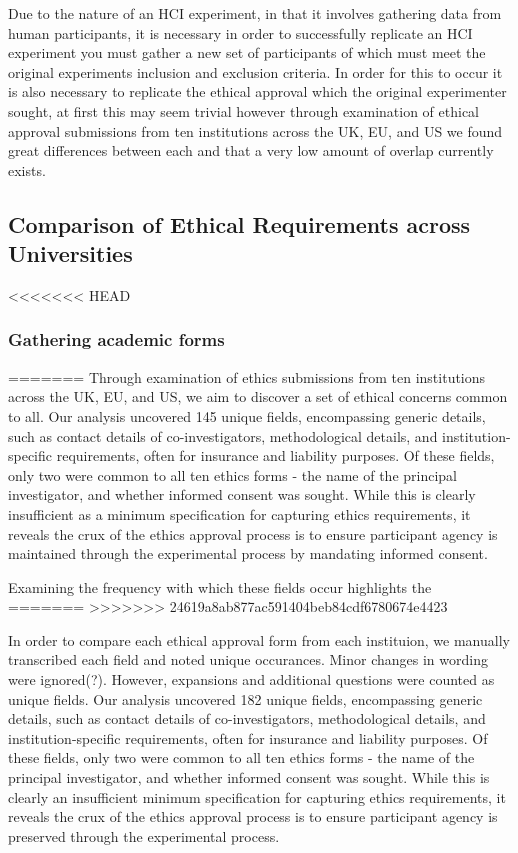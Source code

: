 Due to the nature of an HCI experiment, in that it involves gathering data from human participants, it is necessary in order to successfully replicate an HCI experiment you must gather a new set of participants of which must meet the original experiments inclusion and exclusion criteria. In order for this to occur it is also necessary to replicate the ethical approval which the original experimenter sought, at first this may seem trivial however through examination of ethical approval submissions from ten institutions across the UK, EU, and US we found great differences between each and that a very low amount of overlap currently exists.

\subsection{Comparison of Ethical Requirements across Universities}

<<<<<<< HEAD
\subsubsection{Gathering academic forms}
=======
Through examination of ethics submissions from ten institutions across the UK, EU, and US,
we aim to discover a set of ethical concerns common to all. 
Our analysis uncovered 145 unique fields, 
encompassing generic details, such as contact details of co-investigators, methodological
details, and institution-specific requirements, often for insurance and liability purposes.
Of these fields, only two were common to all ten ethics forms - the name of the principal
investigator, and whether informed consent was sought. While this is clearly insufficient
as a minimum specification for capturing ethics requirements, it reveals the crux of the 
ethics approval process is to ensure participant agency is maintained through the experimental process by mandating informed consent.

Examining the frequency with which these fields occur highlights the 
=======
>>>>>>> 24619a8ab877ac591404beb84cdf6780674e4423




In order to compare each ethical approval form from each instituion, we manually transcribed each field and noted unique occurances. Minor changes in wording were ignored(?). However, expansions and additional questions were counted as unique fields. Our analysis uncovered 182 unique fields, encompassing generic details, such as contact details of co-investigators, methodological details, and institution-specific requirements, often for insurance and liability purposes. Of these fields, only two were common to all ten ethics forms - the name of the principal investigator, and whether informed consent was sought. While this is clearly an insufficient  minimum specification for capturing ethics requirements, it reveals the crux of the ethics approval process is to ensure participant agency is preserved through the experimental process.

